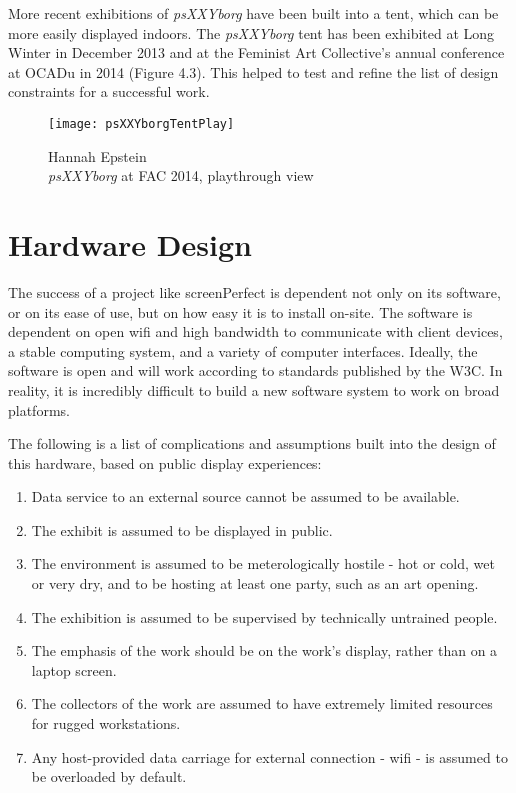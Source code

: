 More recent exhibitions of \textit{psXXYborg} have been built into a tent, which can be more easily displayed indoors. The \textit{psXXYborg} tent has been exhibited at Long Winter in December 2013 and at the Feminist Art Collective's annual conference at OCADu in 2014 (Figure 4.3). This helped to test and refine the list of design constraints for a successful work.

\clearpage
\begin{figure}[!ht]
 \centering
  \texttt{[image: psXXYborgTentPlay]}
  \caption{Hannah Epstein\\\textit{psXXYborg} at FAC 2014, playthrough view}
\end{figure}
\clearpage

\section{Hardware Design}
The success of a project like screenPerfect is dependent not only on its software, or on its ease of use, but on how easy it is to install on-site. The software is dependent on open wifi and high bandwidth to communicate with client devices, a stable computing system, and a variety of computer interfaces. Ideally, the software is open and will work according to standards published by the W3C. In reality, it is incredibly difficult to build a new software system to work on broad platforms.

The following is a list of complications and assumptions built into the design of this hardware, based on public display experiences: 

\begin{enumerate}
\item Data service to an external source cannot be assumed to be available. 
\item The exhibit is assumed to be displayed in public.
\item The environment is assumed to be meterologically hostile - hot or cold, wet or very dry, and to be hosting at least one party, such as an art opening.
\item The exhibition is assumed to be supervised by technically untrained people.
\item The emphasis of the work should be on the work's display, rather than on a laptop screen.
\item The collectors of the work are assumed to have extremely limited resources for rugged workstations.
\item Any host-provided data carriage for external connection - wifi - is assumed to be overloaded by default.
\end{enumerate}

